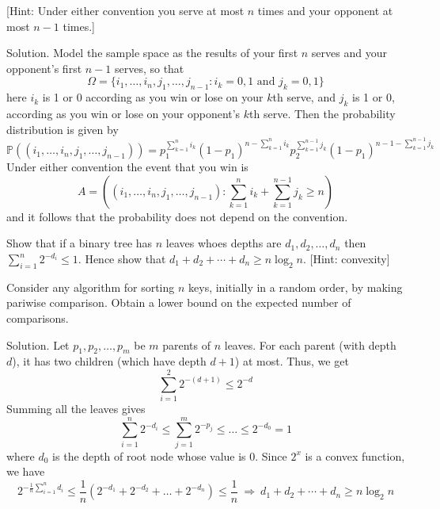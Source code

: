 [Hint: Under either convention you serve at most $n$ times and your opponent at most $n-1$ times.]



Solution. Model the sample space as the results of your first $n$ serves and your opponent's first $n-1$ serves, so that
\begin{equation}
\Omega=\{i_1,\dots,i_n,j_1,\dots,j_{n-1}:i_k=0,1 \text{ and } j_k=0,1\}
\end{equation}
here $i_k$ is 1 or 0 according as you win or lose on your $k$th serve, and $j_k$ is 1 or 0, according as you win or lose on your opponent's $k$th serve. Then the probability distribution is given by 
\begin{equation}
\mathbb{P}((i_1,\dots,i_n,j_1,\dots,j_{n-1})) = p_1^{\sum_{k=1}^ni_k}(1-p_1)^{n-\sum_{k=1}^ni_k}p_2^{\sum_{k=1}^{n-1}j_k}(1-p_1)^{n-1-\sum_{k=1}^{n-1}j_k}
\end{equation}
Under either convention the event that you win is 
\begin{equation}
A = \left((i_1,\dots,i_n,j_1,\dots,j_{n-1}): \sum_{k=1}^ni_k + \sum_{k=1}^{n-1}j_k\geq n\right) 
\end{equation}
and it follows that the probability does not depend on the convention.


\item Show that if a binary tree has $n$ leaves whoes depths are $d_1,d_2,\dots,d_n$ then $\sum^n_{i=1}2^{-d_i}\leq 1$. Hence show that $d_1+d_2+\cdots+d_n\geq n\log_2 n$. [Hint: convexity]

Consider any algorithm for sorting $n$ keys, initially in a random order, by making pariwise comparison. Obtain a lower bound on the expected number of comparisons.


Solution. Let $p_1,p_2,\dots,p_m$ be $m$ parents of $n$ leaves. For each parent (with depth $d$), it has two children (which have depth $d+1$) at most. Thus, we get 
\begin{equation}
\sum^2_{i=1}2^{-(d+1)}\leq 2^{-d}
\end{equation}
\vspace{2mm}
Summing all the leaves gives
\begin{equation}
\sum^n_{i=1}2^{-d_i}\leq \sum^m_{j=1}2^{-p_j}\leq \dots\leq 2^{-d_0} = 1
\end{equation}
where $d_0$ is the depth of root node whose value is 0. Since $2^x$ is a convex function, we have
\begin{equation}
2^{-\frac{1}{n}\sum^n_{i=1}d_i} \leq \frac{1}{n}\left(2^{-d_1}+2^{-d_2}+\dots+2^{-d_n}\right) \leq \frac{1}{n}\ \Rightarrow \ d_1+d_2+\cdots+d_n\geq n\log_2 n
\end{equation}

